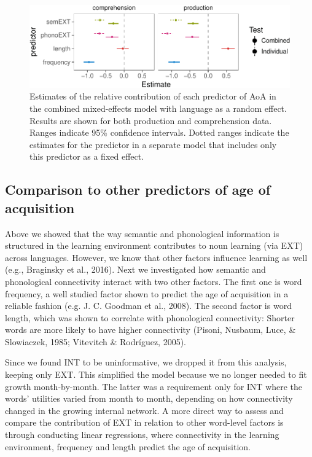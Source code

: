 \documentclass[english,floatsintext,man]{apa6}
\theoremstyle{definition}
\theoremstyle{definition}
\theoremstyle{definition}
\theoremstyle{remark}
\begin{document}
\begin{figure}[!h]
\includegraphics[width=\textwidth]{ms_files/figure-latex/staticAll-1} \caption{Estimates of the relative contribution of each predictor of AoA in the combined mixed-effects model with language as a random effect. Results are shown for both production and comprehension data. Ranges indicate 95\% confidence intervals. Dotted ranges indicate the estimates for the predictor in a separate model that includes only this predictor as a fixed effect.}\label{fig:staticAll}
\end{figure}

\subsection{Comparison to other predictors of age of
acquisition}\label{comparison-to-other-predictors-of-age-of-acquisition}

Above we showed that the way semantic and phonological information is
structured in the learning environment contributes to noun learning (via
EXT) across languages. However, we know that other factors influence
learning as well (e.g., Braginsky et al., 2016). Next we investigated
how semantic and phonological connectivity interact with two other
factors. The first one is word frequency, a well studied factor shown to
predict the age of acquisition in a reliable fashion (e.g. J. C. Goodman
et al., 2008). The second factor is word length, which was shown to
correlate with phonological connectivity: Shorter words are more likely
to have higher connectivity (Pisoni, Nusbaum, Luce, \& Slowiaczek, 1985;
Vitevitch \& Rodríguez, 2005).

Since we found INT to be uninformative, we dropped it from this
analysis, keeping only EXT. This simplified the model because we no
longer needed to fit growth month-by-month. The latter was a requirement
only for INT where the words' utilities varied from month to month,
depending on how connectivity changed in the growing internal network. A
more direct way to assess and compare the contribution of EXT in
relation to other word-level factors is through conducting linear
regressions, where connectivity in the learning environment, frequency
and length predict the age of acquisition.
\end{document}
